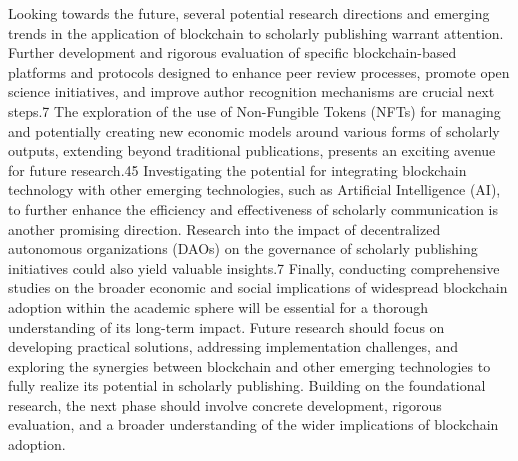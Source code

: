 \documentclass{article}
\begin{document}
Looking towards the future, several potential research directions and emerging trends in the application of blockchain to scholarly publishing warrant attention. Further development and rigorous evaluation of specific blockchain-based platforms and protocols designed to enhance peer review processes, promote open science initiatives, and improve author recognition mechanisms are crucial next steps.7 The exploration of the use of Non-Fungible Tokens (NFTs) for managing and potentially creating new economic models around various forms of scholarly outputs, extending beyond traditional publications, presents an exciting avenue for future research.45 Investigating the potential for integrating blockchain technology with other emerging technologies, such as Artificial Intelligence (AI), to further enhance the efficiency and effectiveness of scholarly communication is another promising direction. Research into the impact of decentralized autonomous organizations (DAOs) on the governance of scholarly publishing initiatives could also yield valuable insights.7 Finally, conducting comprehensive studies on the broader economic and social implications of widespread blockchain adoption within the academic sphere will be essential for a thorough understanding of its long-term impact. Future research should focus on developing practical solutions, addressing implementation challenges, and exploring the synergies between blockchain and other emerging technologies to fully realize its potential in scholarly publishing. Building on the foundational research, the next phase should involve concrete development, rigorous evaluation, and a broader understanding of the wider implications of blockchain adoption.

\end{document}

